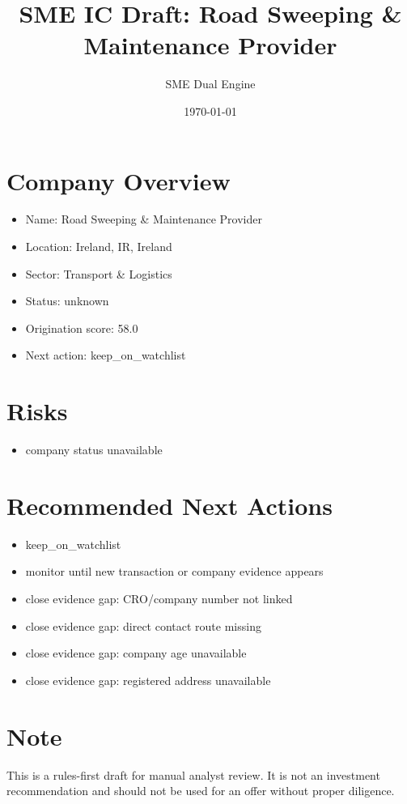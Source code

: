 \documentclass[11pt,a4paper]{article}
\title{SME IC Draft: Road Sweeping \& Maintenance Provider}
\author{SME Dual Engine}
\date{\today}
\begin{document}
\maketitle
\section*{Company Overview}
\begin{itemize}[leftmargin=1.4em]
\item Name: Road Sweeping \& Maintenance Provider
\item Location: Ireland, IR, Ireland
\item Sector: Transport \& Logistics
\item Status: unknown
\item Origination score: 58.0
\item Next action: keep\_on\_watchlist
\end{itemize}
\section*{Risks}
\begin{itemize}[leftmargin=1.4em]
\item company status unavailable
\end{itemize}
\section*{Recommended Next Actions}
\begin{itemize}[leftmargin=1.4em]
\item keep\_on\_watchlist
\item monitor until new transaction or company evidence appears
\item close evidence gap: CRO/company number not linked
\item close evidence gap: direct contact route missing
\item close evidence gap: company age unavailable
\item close evidence gap: registered address unavailable
\end{itemize}
\section*{Note}
This is a rules-first draft for manual analyst review. It is not an investment
recommendation and should not be used for an offer without proper diligence.
\end{document}
